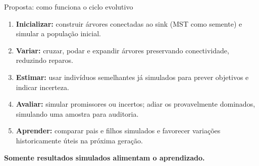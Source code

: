 \begin{frame}{Proposta: como funciona o ciclo evolutivo}
\small
\begin{enumerate}
    \item \textbf{Inicializar:} construir árvores conectadas ao sink
          (MST como semente) e simular a população inicial.
    \item \textbf{Variar:} cruzar, podar e expandir árvores preservando
          conectividade, reduzindo reparos.
    \item \textbf{Estimar:} usar indivíduos semelhantes já simulados
          para prever objetivos e indicar incerteza.
    \item \textbf{Avaliar:} simular promissores ou incertos; adiar os
          provavelmente dominados, simulando uma amostra para auditoria.
    \item \textbf{Aprender:} comparar pais e filhos simulados e favorecer
          variações historicamente úteis na próxima geração.
\end{enumerate}
\medskip
\centering
\textbf{Somente resultados simulados alimentam o aprendizado.}
\end{frame}
